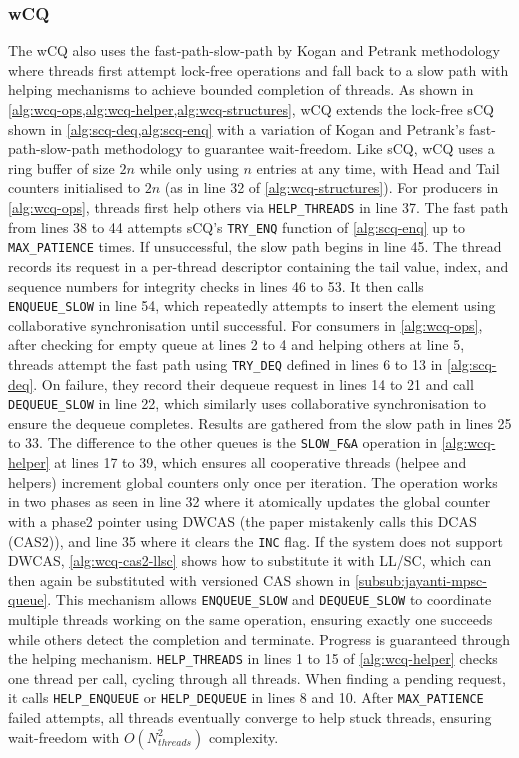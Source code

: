 \subsubsection{\acf{wCQ}}\label{subsubsec:wcq}
The \ac{wCQ} also uses the fast-path-slow-path by Kogan and Petrank methodology where threads first attempt lock-free operations and fall back to a slow path with helping mechanisms to achieve bounded completion of threads. As shown in \cref{alg:wcq-ops,alg:wcq-helper,alg:wcq-structures}, \ac{wCQ} extends the lock-free \ac{sCQ} shown in \cref{alg:scq-deq,alg:scq-enq} with a variation of Kogan and Petrank's fast-path-slow-path methodology to guarantee wait-freedom. Like \ac{sCQ}, \ac{wCQ} uses a ring buffer of size $2n$ while only using $n$ entries at any time, with Head and Tail counters initialised to $2n$ (as in line 32 of \cref{alg:wcq-structures}). For producers in \cref{alg:wcq-ops}, threads first help others via \texttt{HELP\_THREADS} in line 37. The fast path from lines 38 to 44 attempts \ac{sCQ}'s \texttt{TRY\_ENQ} function of \cref{alg:scq-enq} up to \texttt{MAX\_PATIENCE} times. If unsuccessful, the slow path begins in line 45. The thread records its request in a per-thread descriptor containing the tail value, index, and sequence numbers for integrity checks in lines 46 to 53. It then calls \texttt{ENQUEUE\_SLOW} in line 54, which repeatedly attempts to insert the element using collaborative synchronisation until successful. For consumers in \cref{alg:wcq-ops}, after checking for empty queue at lines 2 to 4 and helping others at line 5, threads attempt the fast path using \texttt{TRY\_DEQ} defined in lines 6 to 13 in \cref{alg:scq-deq}. On failure, they record their dequeue request in lines 14 to 21 and call \texttt{DEQUEUE\_SLOW} in line 22, which similarly uses collaborative synchronisation to ensure the dequeue completes. Results are gathered from the slow path in lines 25 to 33. The difference to the other queues is the \texttt{SLOW\_F\&A} operation in \cref{alg:wcq-helper} at lines 17 to 39, which ensures all cooperative threads (helpee and helpers) increment global counters only once per iteration. The operation works in two phases as seen in line 32 where it atomically updates the global counter with a phase2 pointer using \ac{DWCAS} (the paper mistakenly calls this \ac{DCAS} (CAS2)), and line 35 where it clears the \texttt{INC} flag. If the system does not support \ac{DWCAS}, \cref{alg:wcq-cas2-llsc} shows how to substitute it with \ac{LL/SC}, which can then again be substituted with versioned \ac{CAS} shown in \cref{subsub:jayanti-mpsc-queue}. This mechanism allows \texttt{ENQUEUE\_SLOW} and \texttt{DEQUEUE\_SLOW} to coordinate multiple threads working on the same operation, ensuring exactly one succeeds while others detect the completion and terminate. Progress is guaranteed through the helping mechanism. \texttt{HELP\_THREADS} in lines 1 to 15 of \cref{alg:wcq-helper} checks one thread per call, cycling through all threads. When finding a pending request, it calls \texttt{HELP\_ENQUEUE} or \texttt{HELP\_DEQUEUE} in lines 8 and 10. After \texttt{MAX\_PATIENCE} failed attempts, all threads eventually converge to help stuck threads, ensuring wait-freedom with $O(N_{threads}^2)$ complexity. \cite{wCQWaitFreeQueue}

